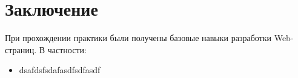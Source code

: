 \section{Заключение}

При прохождении практики были получены базовые навыки разработки Web-страниц. В частности:


\begin{itemize}
  \item dsafdsfsdafasdfsdfasdf
\end{itemize}
